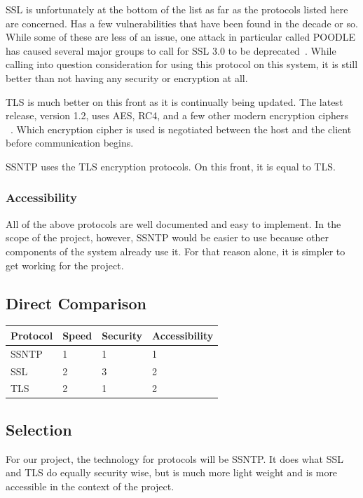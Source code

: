 \documentclass[10pt,letterpaper,onecolumn,journal]{IEEEtran}
\begin{document}
SSL is unfortunately at the bottom of the list as far as the
protocols listed here are concerned. Has a few vulnerabilities that have been
found in the decade or so. While some of these are less of an issue, one attack
in particular called POODLE has caused several major groups to call for SSL 3.0
to be deprecated~\cite{poodle}. While calling into question consideration for
using this protocol on this system, it is still better than not having any
security or encryption at all.

TLS is much better on this front as it is continually being updated. The latest
release, version 1.2, uses AES, RC4, and a few other modern encryption ciphers~
~\cite{tls}. Which encryption cipher is used is negotiated between the host and
the client before communication begins.

SSNTP uses the TLS encryption protocols. On this front, it is equal to TLS.

\subsubsection{Accessibility}
All of the above protocols are well documented and easy to implement. In the
scope of the project, however, SSNTP would be easier to use because other
components of the system already use it. For that reason alone, it is simpler
to get working for the project.

\subsection{Direct Comparison}
\begin{center}
	\begin{tabular}{| l | l | l | l |}
		\hline
		Protocol & Speed & Security & Accessibility \\ \hline
		SSNTP & 1 & 1 & 1 \\ \hline
		SSL & 2 & 3 & 2 \\ \hline
		TLS & 2 & 1 & 2 \\ \hline
	\end{tabular}
\end{center}

\subsection{Selection}
For our project, the technology for protocols will be SSNTP. It does what SSL
and TLS do equally security wise, but is much more light weight and is more
accessible in the context of the project.
\end{document}
